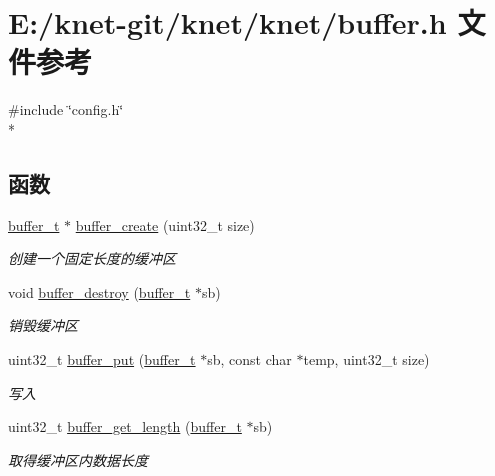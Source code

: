 \hypertarget{a00044}{}\section{E\+:/knet-\/git/knet/knet/buffer.h 文件参考}
\label{a00044}
{\ttfamily \#include \char`\"{}config.\+h\char`\"{}}\\*
\subsection*{函数}
\begin{DoxyCompactItemize}
\item 
\hyperlink{a00050_aad99a77d28bd81d3d36d0ea569c9482d_aad99a77d28bd81d3d36d0ea569c9482d}{buffer\+\_\+t} $\ast$ \hyperlink{a00044_aa5059c5ab47dd3f98ce1d208831dfb88_aa5059c5ab47dd3f98ce1d208831dfb88}{buffer\+\_\+create} (uint32\+\_\+t size)
\begin{DoxyCompactList}\small\item\em 创建一个固定长度的缓冲区 \end{DoxyCompactList}\item 
void \hyperlink{a00044_a75b1ca3205331cdaf7a9f4e6f28c03d9_a75b1ca3205331cdaf7a9f4e6f28c03d9}{buffer\+\_\+destroy} (\hyperlink{a00050_aad99a77d28bd81d3d36d0ea569c9482d_aad99a77d28bd81d3d36d0ea569c9482d}{buffer\+\_\+t} $\ast$sb)
\begin{DoxyCompactList}\small\item\em 销毁缓冲区 \end{DoxyCompactList}\item 
uint32\+\_\+t \hyperlink{a00044_ab3e5b8fef4f96fbba03bcd2a55d5c4e2_ab3e5b8fef4f96fbba03bcd2a55d5c4e2}{buffer\+\_\+put} (\hyperlink{a00050_aad99a77d28bd81d3d36d0ea569c9482d_aad99a77d28bd81d3d36d0ea569c9482d}{buffer\+\_\+t} $\ast$sb, const char $\ast$temp, uint32\+\_\+t size)
\begin{DoxyCompactList}\small\item\em 写入 \end{DoxyCompactList}\item 
uint32\+\_\+t \hyperlink{a00044_a521aa1247c7e0ce15f48da2b3f87ede5_a521aa1247c7e0ce15f48da2b3f87ede5}{buffer\+\_\+get\+\_\+length} (\hyperlink{a00050_aad99a77d28bd81d3d36d0ea569c9482d_aad99a77d28bd81d3d36d0ea569c9482d}{buffer\+\_\+t} $\ast$sb)
\begin{DoxyCompactList}\small\item\em 取得缓冲区内数据长度 \end{DoxyCompactList}\item 

\end{DoxyCompactItemize}
